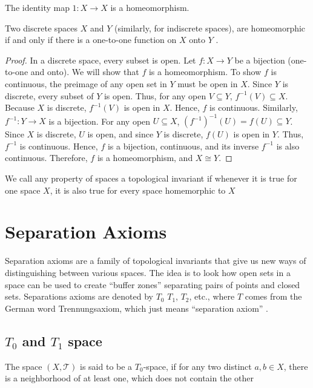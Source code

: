 \documentclass[12pt]{article} %
\begin{document}
\begin{example}
The identity map $1 : X\to X$ is a homeomorphism.
\end{example}

\begin{example}
Two discrete spaces $X$ and $Y$ (similarly, for indiscrete spaces), are homeomorphic if and only if there is a one-to-one function on $X$ onto $Y$ .
\end{example}
\begin{proof}
In a discrete space, every subset is open. Let \( f : X \to Y \) be a bijection (one-to-one and onto). We will show that \( f \) is a homeomorphism. To show \( f \) is continuous, the preimage of any open set in \( Y \) must be open in \( X \). Since \( Y \) is discrete, every subset of \( Y \) is open. Thus, for any open \( V \subseteq Y \),  \( f^{-1}(V) \subseteq X \). Because \( X \) is discrete, \( f^{-1}(V) \) is open in \( X \). Hence, \( f \) is continuous. Similarly, \( f^{-1} : Y \to X \) is a bijection. For any open \( U \subseteq X \), $(f^{-1})^{-1}(U) = f(U) \subseteq Y$. Since \( X \) is discrete, \( U \) is open, and since \( Y \) is discrete, \( f(U) \) is open in \( Y \).  
Thus, \( f^{-1} \) is continuous. Hence, \( f \) is a bijection, continuous, and its inverse \( f^{-1} \) is also continuous. Therefore, \( f \) is a homeomorphism, and \( X \cong Y \).
\end{proof}

\begin{definition}
    We call any property of spaces a topological invariant if whenever it is true for one space $X$, it is also true for every space homemorphic to $X$
\end{definition}



\section{Separation Axioms}
Separation axioms are a family of topological invariants that give us new ways of distinguishing
between various spaces. The idea is to look how open sets in a space can be used to create “buffer
zones” separating pairs of points and closed sets. Separations axioms are denoted by $T_0$ $T_1$, $T_2$, etc., where
$T$ comes from the German word Trennungsaxiom, which just means “separation axiom”  \parencite{schechter1996handbook}.
\subsection{$T_0$ and $T_1$ space}
\begin{definition} \parencite{milewski1994topology} 
    The space \((X, \mathcal{T})\) is said to be a \(T_0\)-space, if for any two distinct \(a, b \in X\), there is a neighborhood of at least one, which does not contain the other 
\end{definition}
\end{document}
